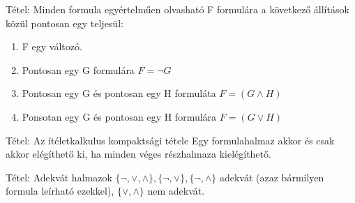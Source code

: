 \documentclass{beamer}
\begin{document}
\begin{frame}[plain]
\end{frame}

\begin{frame}[plain]
\end{frame}


\begin{frame}

\begin{block}{Tétel: Minden formula egyértelműen olvasható}
F formulára a következő állítások közül pontosan egy teljesül:

\begin{enumerate}
\item F egy változó.
\item Pontosan egy G formulára $F = \neg G$
\item Pontosan egy G és pontosan egy H formuláta $F = (G \land H)$
\item Ponsotan egy G és pontosan egy H formulára $F = (G \lor H)$
\end{enumerate}

\end{block}

\end{frame}


\begin{frame}

\begin{block}{Tétel: Az ítéletkalkulus kompaktsági tétele}
Egy formulahalmaz akkor és csak akkor elégíthető ki, ha minden véges részhalmaza kielégíthető.

\end{block}

\begin{block}{Tétel: Adekvát halmazok}
$\{\neg, \lor, \land\}, \{\neg, \lor\}, \{\neg, \land\}$ adekvát (azaz bármilyen formula leírható ezekkel), $\{\lor, \land\}$ nem adekvát.

\end{block}

\end{frame}
\end{document}
